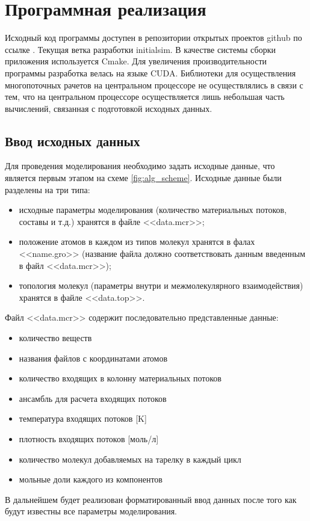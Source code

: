 \section{Программная реализация}
Исходный код программы доступен в репозитории открытых проектов github  по ссылке \cite{github_mcr}. Текущая ветка разработки initialsim. В качестве системы сборки приложения используется Cmake. Для увеличения производительности программы разработка велась на языке CUDA. Библиотеки для осуществления многопоточных рачетов на центральном процессоре не осуществлялись в связи с тем, что на центральном процессоре осуществляется лишь небольшая часть вычислений, связанная с подготовкой исходных данных.

\subsection{Ввод исходных данных}
Для проведения моделирования необходимо задать исходные данные, что является первым этапом на схеме \ref{fig:alg_scheme}. Исходные данные были разделены на три типа: 
\begin{itemize}
	\item исходные параметры моделирования (количество материальных потоков, составы и т.д.) хранятся в файле <<data.mcr>>;
	\item положение атомов в каждом из типов молекул хранятся в фалах <<name.gro>> (название файла должно соответствовать данным введенным в файл <<data.mcr>>);
	\item  топология молекул (параметры внутри и межмолекулярного взаимодействия) хранятся в файле <<data.top>>.
\end{itemize}


Файл <<data.mcr>> содержит последовательно представленные данные:
\begin{itemize}
	\item количество веществ \item названия файлов с координатами атомов \item количество входящих в колонну материальных потоков \item ансамбль для расчета входящих потоков \item температура входящих потоков [K] \item плотность входящих потоков [моль/л] \item количество молекул добавляемых на тарелку в каждый цикл \item мольные доли каждого из компонентов
\end{itemize}
В дальнейшем будет реализован форматированный ввод данных после того как будут известны все параметры моделирования.

